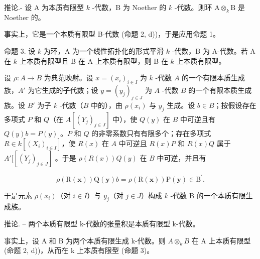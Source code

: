 推论.- 设 A 为本质有限型 \(k\) -代数，B 为 Noether 的 \(k\) -代数。则环 \(\mathrm{A} \otimes_k \mathrm{B}\) 是 Noether 的。

事实上，它是一个本质有限型 B-代数 (命题 2, d))，于是应用命题 1。

命题 3. 设 \(k\) 为环，A 为一个线性拓扑化的形式平滑 \(k\) -代数，B 为 A-代数。若 A 在 \(k\) 上本质有限型且 B 在 A 上本质有限型，则 B 在 \(k\) 上本质有限型。

设 \(\rho: A \to B\) 为典范映射。设 \(x = (x_i)_{i \in I}\) 为 \(k\) -代数 \(A\) 的一个有限本质生成族，\(A'\) 为它生成的子代数；设 \(y = (y_j)_{j \in J}\) 为 \(A\) -代数 \(B\) 的一个有限本质生成族。设 \(B'\) 为子 \(k\) -代数（\(B\) 中的），由 \(\rho(x_i)\) 与 \(y_j\) 生成。设 \(b \in B\)；按假设存在多项式 \(P\) 和 \(Q\)（在 \(A[(Y_j)_{j \in J}]\) 中），使 \(Q(y)\) 在 \(B\) 中可逆且有 \(Q(y)b = P(y)\) 。\(P\) 和 \(Q\) 的非零系数只有有限多个；存在多项式 \(R \in k[(X_i)_{i \in I}]\)，使 \(R(x)\) 在 \(A\) 中可逆且 \(R(x)P\) 和 \(R(x)Q\) 属于 \(A'[[(Y_j)_{j \in J}]\) 。于是 \(\rho(R(x))Q(y)\) 在 \(B\) 中可逆，并且有

\[
\rho (\mathrm{R} (\mathbf {x})) \mathrm{Q} (\mathbf {y}) b = \rho (\mathrm{R} (\mathbf {x})) \mathrm{P} (\mathbf {y}) \in \mathrm{B} ^ {\prime}.
\]

于是元素 \(\rho(x_i)\)（对 \(i \in I\)）与 \(y_j\)（对 \(j \in J\)）构成 \(k\) -代数 B 的一个本质有限生成族。

推论. -- 两个本质有限型 k-代数的张量积是本质有限型 k-代数。

事实上，设 A 和 B 为两个本质有限生成 k-代数。则 \(A \otimes_{k} B\) 在 A 上本质有限型 (命题 2, d))，从而在 k 上本质有限型 (命题 3)。


